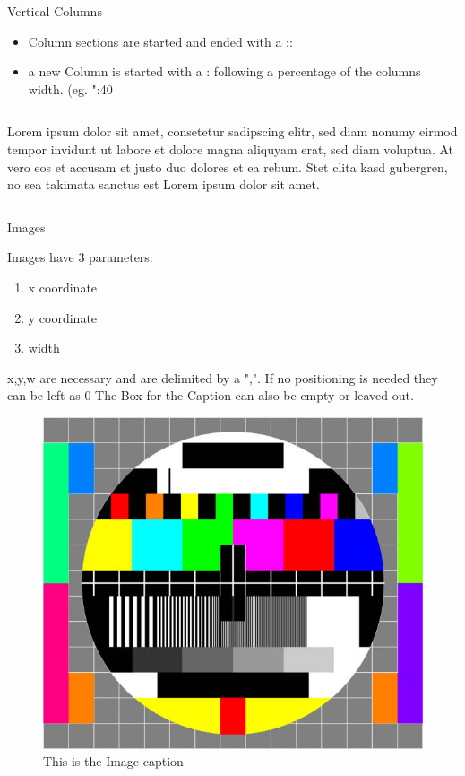 \documentclass{beamer}
\begin{document}
\begin{frame}{Vertical Columns}

\begin{itemize}
\item Column sections are started and ended with a ::\item a new Column is started with a : following a percentage of the columns width. (eg. ":40%
\end{itemize}

\begin{columns}
Lorem ipsum dolor sit amet, consetetur sadipscing elitr, sed diam nonumy eirmod tempor invidunt ut labore et dolore magna aliquyam erat, sed diam voluptua.
At vero eos et accusam et justo duo dolores et ea rebum. Stet clita kasd gubergren, no sea takimata sanctus est Lorem ipsum dolor sit amet.
\end{columns}

\end{frame}
\begin{frame}{Images}

Images have 3 parameters:
\begin{enumerate}
\item x coordinate
\item y coordinate
\item width
\end{enumerate}

x,y,w are necessary and are delimited by a ",". If no positioning is needed they can be left as 0
The Box for the Caption can also be empty or leaved out.

\begin{figure}
\hspace*{0\textwidth}
\vspace*{0\textwidth}
\includegraphics[width=0.25\linewidth]{./test.jpg}
\caption{This is the Image caption}
\end{figure}

\end{frame}
\end{document}

